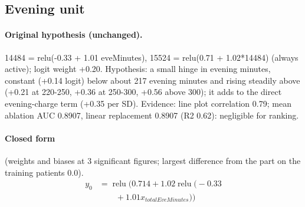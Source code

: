 \documentclass[a4paper,10pt]{article}
\newif\ifreviewmarks
\newcommand{\reviewrule}{\noindent{\color{BrickRed}\rule{\linewidth}{0.8pt}}}
\newenvironment{drafted}[1][]{%
  \ifreviewmarks\par\addvspace{\medskipamount}\reviewrule\par\nopagebreak
  \noindent{\color{BrickRed}\sffamily\footnotesize\textbf{Thesis Draft}\quad #1\hfill review}\par\nopagebreak\smallskip\fi}{%
  \ifreviewmarks\par\smallskip\noindent{\color{BrickRed}\sffamily\footnotesize end of thesis draft}\par\nopagebreak\reviewrule\par\medskip\fi}
\begin{document}
\begin{drafted}[plain-language layer: churn100-s4-c2]
\subsection{Evening unit}\label{tech:ann83}
\paragraph{Original hypothesis (unchanged).} 14484 = relu(-0.33 + 1.01 eveMinutes), 15524 = relu(0.71 + 1.02*14484) (always active); logit weight +0.20. Hypothesis: a small hinge in evening minutes, constant (+0.14 logit) below about 217 evening minutes and rising steadily above (+0.21 at 220-250, +0.36 at 250-300, +0.56 above 300); it adds to the direct evening-charge term (+0.35 per SD). Evidence: line plot correlation 0.79; mean ablation AUC 0.8907, linear replacement 0.8907 (R2 0.62): negligible for ranking.
\paragraph{Closed form} {\footnotesize(weights and biases at 3 significant figures; largest difference from the part on the training patients 0.0).}
{\small\begingroup\allowdisplaybreaks
\begin{align*}
y_{0} &= \operatorname{relu}\bigl(0.714 + 1.02 \operatorname{relu}\bigl(-0.33 \\
&\qquad + 1.01 x_{totalEveMinutes}\bigr)\bigr)
\end{align*}\endgroup}


\end{drafted}
\end{document}
